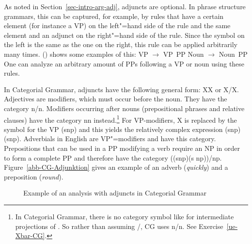 As noted in Section~\ref{sec-intro-arg-adj}, adjuncts are optional. In phrase
structure grammars, this can be captured, for example, by rules that have a certain element (for
instance a VP) on the left"=hand side of the rule and the same element and an adjunct on the
right"=hand side of the rule. Since the symbol on the left is the same as the one on the right, this rule can be
applied arbitrarily many times. () shows some examples of this:
\eal
\ex VP $\to$ VP~PP
\ex Noun $\to$ Noun~PP
\zl
One can analyze an arbitrary amount of PPs following a VP or noun using these rules.

In Categorial Grammar, adjuncts have the following general form: X\bs X or X/X.
Adjectives are modifiers, which must occur before the noun. They have the category n/n.
Modifiers occurring after nouns (prepositional phrases and relative clauses) have the category
n\bs n instead.\footnote{
	In Categorial Grammar, there is no category symbol like \xbar for intermediate projections of
	\xbart. So rather than assuming \nbar/\nbar, CG uses n/n. See Exercise~\ref{ue-Xbar-CG}.
} For VP-modifiers, X is replaced by the symbol for the VP (s\bs np) and this yields the relatively complex expression (s\bs np)\bs (s\bs np).
Adverbials in English are VP"=modifiers and have this category. Prepositions that can be used in a PP modifying a verb require an NP in order to
form a complete PP and therefore have the category ((s\bs np)\bs (s\bs
np))/np. Figure~\vref{abb-CG-Adjunktion} gives an example of an adverb (\emph{quickly}) and a preposition (\emph{round}). 
%
\begin{figure}
\caption{\label{abb-CG-Adjunktion}Example of an analysis with adjuncts in Categorial Grammar}
\end{figure}%
